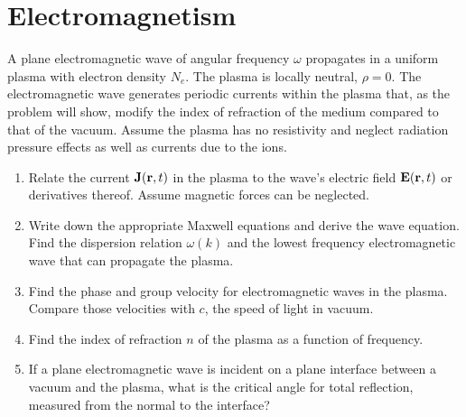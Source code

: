 \def\bd{\bm{\delta}}
\section{Electromagnetism}
\begin{problem}
  A plane electromagnetic wave of angular frequency $\omega$ propagates in a uniform plasma with electron density $N_e$. The plasma is locally neutral, $\rho=0$. The electromagnetic wave generates periodic currents within the plasma that, as the problem will show, modify the index of refraction of the medium compared to that of the vacuum.
Assume the plasma has no resistivity and neglect radiation pressure effects as well as currents due to the ions.
\begin{enumerate}[label=(\alph*)]
\item Relate the current $\vb{J}(\vb{r}, t)$ in the plasma to the wave’s electric field $\vb{E}(\vb{r}, t)$ or derivatives thereof. Assume magnetic forces can be neglected.
\item Write down the appropriate Maxwell equations and derive the wave equation. Find the dispersion relation $\omega(k)$ and the lowest frequency electromagnetic wave that can propagate the plasma.
\item Find the phase and group velocity for electromagnetic waves in the plasma. Compare those velocities with $c$, the speed of light in vacuum.
\item Find the index of refraction $n$ of the plasma as a function of frequency.
\item If a plane electromagnetic wave is incident on a plane interface between a vacuum and the plasma, what is the critical angle for total reflection, measured from the normal to the interface?
\end{enumerate}
\end{problem}

